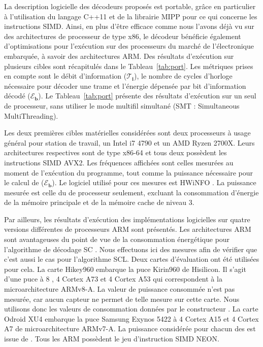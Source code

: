 \begin{table}[t]
{{\begin{tabular}{r|c|c|c c c c| c c c| c c c}
    \end{tabular}
    }}
  \end{table}

La description logicielle des décodeurs proposés est portable, grâce en particulier à l'utilisation du langage C++11 et de la librairie MIPP \cite{cassagne2018mipp} pour ce qui concerne les instructions SIMD. Ainsi, en plus d'être efficace comme nous l'avons déjà vu sur des architectures de processeur de type x86, le décodeur bénéficie également d'optimisations pour l'exécution sur des processeurs du marché de l'électronique embarquée, à savoir des architectures ARM. Des résultats d'exécution sur plusieurs cibles sont récapitulés dans le Tableau~\ref{tab:port}. Les métriques prises en compte sont le débit d'information ($\bm{\mathcal{T}_i}$), le nombre de cycles d'horloge nécessaire pour décoder une trame et l'énergie dépensée par bit d'information décodé ($\bm{\mathcal{E}_b}$). Le Tableau~\ref{tab:port}  présente des résultats d'exécution sur un seul \coeur de processeur, sans utiliser le mode multifil simultané (SMT : Simultaneous MultiThreading).

Les deux premières cibles matérielles considérées sont deux processeurs à usage général pour station de travail, un Intel i7 4790 et un AMD Ryzen 2700X. Leurs architectures respectives sont de type x86-64 et tous deux possèdent les instructions SIMD AVX2. Les fréquences affichées sont celles mesurées au moment de l'exécution du programme, tout comme la puissance nécessaire pour le calcul de ($\bm{\mathcal{E}_b}$). Le logiciel utilisé pour ces mesures est HWiNFO \cite{noauthor_hwinfo_nodate}. La puissance mesurée est celle du \coeur de processeur seulement, excluant la consommation d'énergie de la mémoire principale et de la mémoire cache de niveau 3.

Par ailleurs, les résultats d'exécution des implémentations logicielles sur quatre versions différentes de processeurs ARM sont présentés. Les architectures ARM sont avantageuses du point de vue de la consommation énergétique pour l'algorithme de décodage SC \cite{cassagne_energy_2016}. Nous effectuons ici des mesures afin de vérifier que c'est aussi le cas pour l'algorithme SCL. Deux cartes d'évaluation ont été utilisées pour cela. La carte Hikey960 embarque la puce Kirin960 de Hisilicon. Il s'agit d'une puce à 8 \coeurs, 4 Cortex A73 et 4 Cortex A53 qui correspondent à la microarchitecture ARMv8-A. La valeur de puissance consommée n'est pas mesurée, car aucun capteur ne permet de telle mesure sur cette carte. Nous utilisons donc les valeurs de consommation données par le constructeur \cite{humrick_hisilicon_nodate}. La carte Odroid XU4 embarque la puce Samsung Exynos 5422 à 4 \coeurs Cortex A15 et 4 \coeurs Cortex A7 de microarchitecture ARMv7-A. La puissance considérée pour chacun des \coeurs est issue de \cite{holmgren_energy_nodate,benmoussa_performance_nodate}. Tous les \coeurs ARM possèdent le jeu d'instruction SIMD NEON.

